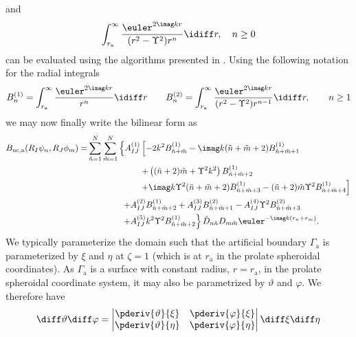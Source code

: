 and
\begin{equation}\label{Eq2:2ndIntegralType}
	\int_{r_{\mathrm{a}}}^\infty\frac{\euler^{2\imag k r}}{(r^2-\Upsilon^2)r^n}\idiff r, \quad n\geq 0
\end{equation}
can be evaluated using the algorithms presented in . Using the following notation for the radial integrals
\begin{equation*}
	B_{n}^{(1)} = \int_{r_{\mathrm{a}}}^\infty \frac{\euler^{2\imag k r}}{r^n}\idiff r \qquad B_{n}^{(2)} = \int_{r_{\mathrm{a}}}^\infty \frac{\euler^{2\imag k r}}{(r^2-\Upsilon^2)r^{n-1}}\idiff r,\qquad n\geq 1
\end{equation*}
we may now finally write the bilinear form as
\begin{align}\label{Eq2:finalBilinearFormB_uc_a}
\begin{split}
	B_{\mathrm{uc},\mathrm{a}}(R_I\psi_n,R_J\phi_m) = &\sum_{\tilde{n}=1}^N\sum_{\tilde{m}=1}^N\left\{A_{IJ}^{(1)}\left[-2k^2B_{\tilde{n}+\tilde{m}}^{(1)}-\imag k(\tilde{n}+\tilde{m}+2)B_{\tilde{n}+\tilde{m}+1}^{(1)} \right.\right.\\
	&\left.\left.\qquad\qquad\qquad + \left((\tilde{n}+2)\tilde{m}+\Upsilon^2k^2\right)B_{\tilde{n}+\tilde{m}+2}^{(1)} \right.\right.\\
	&\left.\left.\qquad\qquad\qquad + \imag k \Upsilon^2(\tilde{n}+\tilde{m}+2)B_{\tilde{n}+\tilde{m}+3}^{(1)}-(\tilde{n}+2)\tilde{m} \Upsilon^2 B_{\tilde{n}+\tilde{m}+4}^{(1)}\right]\right.\\
	&\left.\qquad\qquad + A_{IJ}^{(2)} B_{\tilde{n}+\tilde{m}+2}^{(1)} +A_{IJ}^{(3)}B_{\tilde{n}+\tilde{m}+1}^{(2)} - A_{IJ}^{(4)} \Upsilon^2B_{\tilde{n}+\tilde{m}+3}^{(2)} \right.\\
	&\left.\qquad\qquad + A_{IJ}^{(5)} k^2 \Upsilon^2 B_{\tilde{n}+\tilde{m}+2}^{(1)}\right\}\tilde{D}_{n\tilde{n}}D_{m\tilde{m}}\euler^{-\imag k (r_n+r_m)}.
\end{split}
\end{align}
We typically parameterize the domain such that the artificial boundary $\Gamma_{\mathrm{a}}$ is parameterized by $\xi$ and $\eta$ at $\zeta=1$ (which is at $r_{\mathrm{a}}$ in the prolate spheroidal coordinates). As $\Gamma_{\mathrm{a}}$ is a surface with constant radius, $r=r_{\mathrm{a}}$, in the prolate spheroidal coordinate system, it may also be parametrized by $\vartheta$ and $\varphi$. We therefore have
\begin{equation}
	\diff \vartheta\diff\varphi = \begin{vmatrix}
		\pderiv{\vartheta}{\xi} & \pderiv{\varphi}{\xi}\\
		\pderiv{\vartheta}{\eta} & \pderiv{\varphi}{\eta}		
	\end{vmatrix}\diff\xi\diff\eta
\end{equation}
